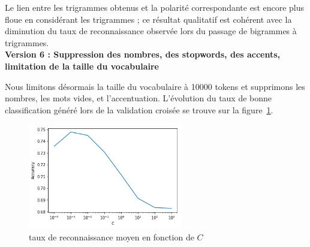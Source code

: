 \documentclass[a4paper]{article}
\newcommand{\figref}[1]{figure~\ref{#1}}
\begin{document}
\begin{table}[H]
\centering
{}
\caption{20 trigrammes les plus polarisés}
\label{tab:tme3-task2-v4-w}
\end{table}

Le lien entre les trigrammes obtenus et la polarité correspondante est encore
plus floue en considérant les trigrammes ; ce résultat qualitatif est cohérent
avec la diminution du taux de reconnaissance observée lors du passage de
bigrammes à trigrammes. \\

\textbf{Version 6 : Suppression des nombres, des stopwords, des accents, limitation de la
taille du vocabulaire}

Nous limitons désormais la taille du vocabulaire à 10000 tokens et supprimons
les nombres, les mots vides, et l'accentuation. L'évolution du taux de bonne
classification généré lors de la validation croisée se trouve sur la
\figref{img:tme2-task2-v5}.

\begin{figure}[H]
	\center 
	\includegraphics[width=0.6\textwidth]{images/tme2/task2_v5.png}
    \caption{taux de reconnaissance moyen en fonction de $C$}
    \label{img:tme2-task2-v5}
\end{figure}
\end{document}
